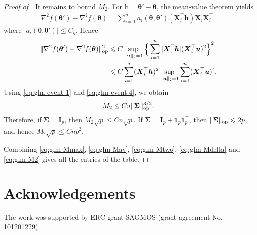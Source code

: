 \documentclass[aos,reqno]{imsart}
\newcommand\bX{\boldsymbol X}
\newcommand\bh{\boldsymbol h}
\newcommand\bu{\boldsymbol u}
\newcommand\btheta{\boldsymbol\theta}
\newcommand\bSigma{\boldsymbol\Sigma}
\theoremstyle{definition}
\begin{document}
\begin{proof}[Proof of ]
It remains to bound $M_2$. For
$\bh=\btheta'-\btheta$, the mean-value theorem yields
\begin{align}
    \nabla^2 f(\btheta')-\nabla^2 f(\btheta)
    =
    \sum_{i=1}^n
    a_i(\btheta,\btheta')(\bX_i^\top\bh)
    \bX_i\bX_i^\top,
\end{align}
where $|a_i(\btheta,\btheta')|\leqslant  C_g$. Hence
\begin{align}
    \|\nabla^2 f(\btheta')-\nabla^2 f(\btheta)\|_{\rm 
    op}^2 &\leqslant C 
    \sup_{\|\bu\|_2=1} \Big\{\sum_{i=1}^n |\bX_i^\top\bh|
    (\bX_i^\top\bu)^2\Big\}^2\\
    &\leqslant C\sum_{i=1}^n(\bX_i^\top\bh)^2 
    \sup_{\|\bu\|_2=1} \sum_{i=1}^n (\bX_i^\top\bu)^4.
\end{align}
Using \eqref{eq:glm-event-1} and \eqref{eq:glm-event-4},
we obtain
\begin{align}
    M_2
    \leq
    Cn\|\bSigma\|_{\rm op}^{3/2}.
    \label{eq:glm-M2}
\end{align}
Therefore, if $\bSigma=\mathbf I_p$, then
$M_2\sqrt p\leqslant Cn\sqrt p$. If
$\bSigma=\mathbf I_p+\mathbf 1_p\mathbf 1_p^\top$,
then $\|\bSigma\|_{\rm op}\leqslant 2 p$, and hence
$M_2\sqrt p\leqslant Cnp^2$.

Combining \eqref{eq:glm-Mmax}, \eqref{eq:glm-Mav},
\eqref{eq:glm-Mtwo}, \eqref{eq:glm-Mdelta} and
\eqref{eq:glm-M2} gives all the entries of the table.
\end{proof}


\section*{Acknowledgements} 
The work was supported by ERC grant SAGMOS (grant 
agreement No. 101201229).



\end{document}
